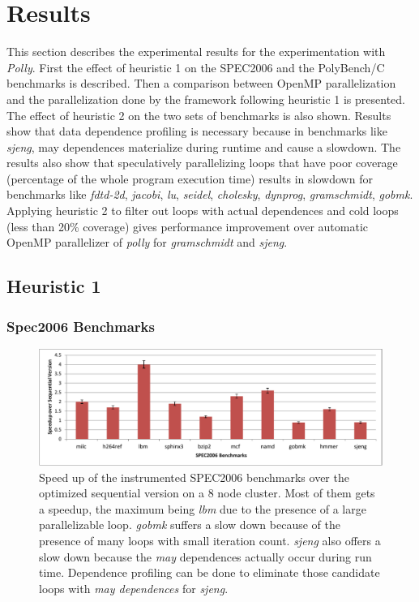 \documentclass[10pt]{report}          %
\begin{document}
\section{Results}
\label{section:results}

This section describes the experimental results for the experimentation with \textit{Polly}.  First the effect of heuristic 1 on the SPEC2006 and the PolyBench/C benchmarks is described.  Then a comparison between OpenMP parallelization and the parallelization done by the framework following heuristic 1 is presented.  The effect of heuristic 2 on the two sets of benchmarks is also shown.  Results show that data dependence profiling is necessary because in benchmarks like \textit{sjeng}, may dependences materialize during runtime and cause a slowdown. The results also show that speculatively parallelizing loops that have poor coverage (percentage of the whole program execution time) results in slowdown for benchmarks like \textit{fdtd-2d}, \textit{jacobi}, \textit{lu}, \textit{seidel}, \textit{cholesky}, \textit{dynprog}, \textit{gramschmidt}, \textit{gobmk}.  Applying heuristic 2 to filter out loops with actual dependences and cold loops (less than 20\% coverage) gives performance improvement over automatic OpenMP parallelizer of \textit{polly} for \textit{gramschmidt} and \textit{sjeng}.

\subsection{Heuristic 1}

\subsubsection{Spec2006 Benchmarks}

\begin{figure}
\begin{center}
\includegraphics[scale =0.75]{./pdf/speedup_spec2006.pdf}
\caption{Speed up of the instrumented SPEC2006 benchmarks over the optimized sequential version on a 8 node cluster. Most of them gets a speedup, the maximum being \textit{lbm} due to the presence of a large parallelizable loop. \textit{gobmk} suffers a slow down because of the presence of many loops with small iteration count. \textit{sjeng} also offers a slow down because the \textit{may} dependences actually occur during run time. Dependence profiling can be done to eliminate those candidate loops with \textit{may dependences} for \textit{sjeng}.}
\end{center}
\label{fig:speedup_spec2006}
\end{figure}
\end{document}
